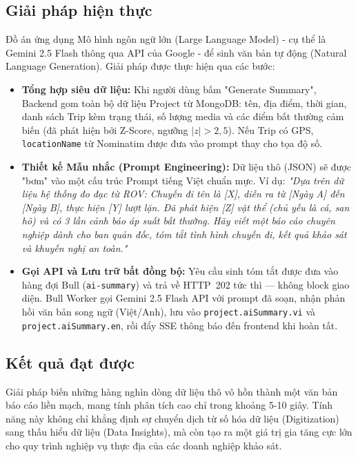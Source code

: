 \documentclass[../DoAn.tex]{subfiles}
\begin{document}
\subsection{Giải pháp hiện thực}
Đồ án ứng dụng Mô hình ngôn ngữ lớn (Large Language Model) - cụ thể là Gemini 2.5 Flash thông qua API của Google - để sinh văn bản tự động (Natural Language Generation). Giải pháp được thực hiện qua các bước:
\begin{itemize}
    \item \textbf{Tổng hợp siêu dữ liệu:} Khi người dùng bấm "Generate Summary", Backend gom toàn bộ dữ liệu Project từ MongoDB: tên, địa điểm, thời gian, danh sách Trip kèm trạng thái, số lượng media và các điểm bất thường cảm biến (đã phát hiện bởi Z-Score, ngưỡng $|z|>2{,}5$). Nếu Trip có GPS, \texttt{locationName} từ Nominatim được đưa vào prompt thay cho tọa độ số.
    \item \textbf{Thiết kế Mẫu nhắc (Prompt Engineering):} Dữ liệu thô (JSON) sẽ được "bơm" vào một cấu trúc Prompt tiếng Việt chuẩn mực. Ví dụ: \textit{"Dựa trên dữ liệu hệ thống đo đạc từ ROV: Chuyến đi tên là [X], diễn ra từ [Ngày A] đến [Ngày B], thực hiện [Y] lượt lặn. Đã phát hiện [Z] vật thể (chủ yếu là cá, san hô) và có 3 lần cảnh báo áp suất bất thường. Hãy viết một báo cáo chuyên nghiệp dành cho ban quản đốc, tóm tắt tình hình chuyến đi, kết quả khảo sát và khuyến nghị an toàn."}
    \item \textbf{Gọi API và Lưu trữ bất đồng bộ:} Yêu cầu sinh tóm tắt được đưa vào hàng đợi Bull (\texttt{ai-summary}) và trả về HTTP~202 tức thì — không block giao diện. Bull Worker gọi Gemini 2.5 Flash API với prompt đã soạn, nhận phản hồi văn bản song ngữ (Việt/Anh), lưu vào \texttt{project.aiSummary.vi} và \texttt{project.aiSummary.en}, rồi đẩy SSE thông báo đến frontend khi hoàn tất.
\end{itemize}

\subsection{Kết quả đạt được}
Giải pháp biến những hàng nghìn dòng dữ liệu thô vô hồn thành một văn bản báo cáo liền mạch, mang tính phân tích cao chỉ trong khoảng 5-10 giây. Tính năng này không chỉ khẳng định sự chuyển dịch từ số hóa dữ liệu (Digitization) sang thấu hiểu dữ liệu (Data Insights), mà còn tạo ra một giá trị gia tăng cực lớn cho quy trình nghiệp vụ thực địa của các doanh nghiệp khảo sát.
\end{document}
